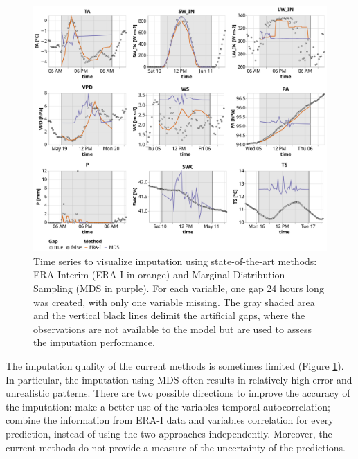 \documentclass{article}
\newcommand{\imgwidth}{6in}
\begin{document}
\begin{figure}
    \centerline{\includegraphics[width=\imgwidth]{timeseries_sota.pdf}}
\caption{Time series to visualize imputation using state-of-the-art methods: ERA-Interim (ERA-I in orange) and Marginal Distribution Sampling (MDS in purple). For each variable, one gap 24 hours long was created, with only one variable missing. The gray shaded area and the vertical black lines delimit the artificial gaps, where the observations are not available to the model but are used to assess the imputation performance.}
\label{fig:ts_sota}
\end{figure}

The imputation quality of the current methods is sometimes limited (Figure \ref{fig:ts_sota}). In particular, the imputation using MDS often results in relatively high error and unrealistic patterns. There are two possible directions to improve the accuracy of the imputation:  make a better use of the variables temporal autocorrelation; combine the information from ERA-I data and variables correlation for every prediction, instead of using the two approaches independently. Moreover, the current methods do not provide a measure of the uncertainty of the predictions.
\end{document}
